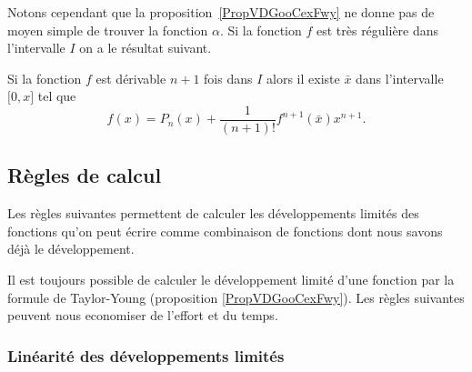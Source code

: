 Notons cependant que la proposition~\ref{PropVDGooCexFwy} ne donne pas de moyen simple de trouver la fonction \( \alpha\). Si la fonction $f$ est très régulière dans l'intervalle $I$ on a le résultat suivant.

\begin{proposition}
    Si la fonction $f$ est dérivable $n+1$ fois dans $I$ alors il existe $\bar x$ dans l'intervalle \( \mathopen[ 0 , x \mathclose]\) tel que
  \begin{equation}
    f(x) = P_n(x) + \frac{1}{(n+1)!} f^{n+1}(\bar x) x^{n+1}.
  \end{equation}
\end{proposition}

\subsection{Règles de calcul}

    Les règles suivantes permettent de calculer les développements limités des fonctions qu'on peut écrire comme combinaison de fonctions dont nous savons déjà le développement.

    Il est toujours possible de calculer le développement limité d'une fonction par la formule de Taylor-Young (proposition \ref{PropVDGooCexFwy}). Les règles suivantes peuvent nous economiser de l'effort et du temps.

\subsubsection{Linéarité des développements limités}

